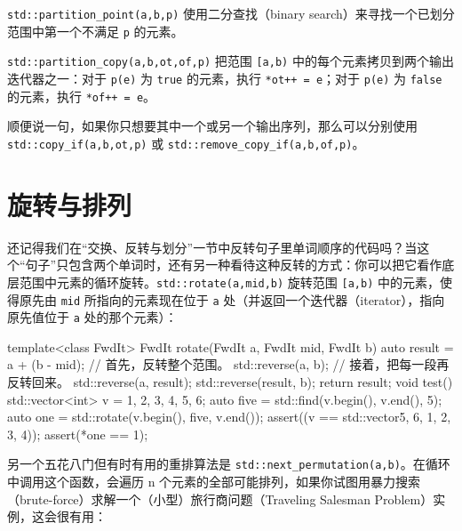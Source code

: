 \texttt{std::\allowbreak{}partition\_\allowbreak{}point(\allowbreak{}a,\allowbreak{}b,\allowbreak{}p)\allowbreak{}} 使用二分查找（binary search）来寻找一个已划分范围中第一个不满足 \texttt{p} 的元素。

\texttt{std::\allowbreak{}partition\_\allowbreak{}copy(\allowbreak{}a,\allowbreak{}b,\allowbreak{}ot,\allowbreak{}of,\allowbreak{}p)\allowbreak{}} 把范围 \texttt{[a,\allowbreak{}b)\allowbreak{}} 中的每个元素拷贝到两个输出迭代器之一：对于 \texttt{p(\allowbreak{}e)\allowbreak{}} 为 \texttt{true} 的元素，执行 \texttt{*ot++ = e}；对于 \texttt{p(\allowbreak{}e)\allowbreak{}} 为 \texttt{false} 的元素，执行 \texttt{*of++ = e}。

顺便说一句，如果你只想要其中一个或另一个输出序列，那么可以分别使用 \texttt{std::\allowbreak{}copy\_\allowbreak{}if(\allowbreak{}a,\allowbreak{}b,\allowbreak{}ot,\allowbreak{}p)\allowbreak{}} 或 \texttt{std::\allowbreak{}remove\_\allowbreak{}copy\_\allowbreak{}if(\allowbreak{}a,\allowbreak{}b,\allowbreak{}of,\allowbreak{}p)\allowbreak{}}。

\section{旋转与排列}

还记得我们在“交换、反转与划分”一节中反转句子里单词顺序的代码吗？当这个“句子”只包含两个单词时，还有另一种看待这种反转的方式：你可以把它看作底层范围中元素的循环旋转。\texttt{std::\allowbreak{}rotate(\allowbreak{}a,\allowbreak{}mid,\allowbreak{}b)\allowbreak{}} 旋转范围 \texttt{[a,\allowbreak{}b)\allowbreak{}} 中的元素，使得原先由 \texttt{mid} 所指向的元素现在位于 \texttt{a} 处（并返回一个迭代器（iterator），指向原先值位于 \texttt{a} 处的那个元素）：

\begin{codebox}[cpp]
     template<class FwdIt>
     FwdIt rotate(FwdIt a, FwdIt mid, FwdIt b)
     {
       auto result = a + (b - mid);
       // 首先，反转整个范围。
       std::reverse(a, b);
       // 接着，把每一段再反转回来。
       std::reverse(a, result);
       std::reverse(result, b);
       return result;
     }
     void test()
     {
       std::vector<int> v = {1, 2, 3, 4, 5, 6};
       auto five = std::find(v.begin(), v.end(), 5);
       auto one = std::rotate(v.begin(), five, v.end());
       assert((v == std::vector{5, 6, 1, 2, 3, 4}));
       assert(*one == 1);
     }
\end{codebox}

另一个五花八门但有时有用的重排算法是 \texttt{std::\allowbreak{}next\_\allowbreak{}permutation(\allowbreak{}a,\allowbreak{}b)\allowbreak{}}。在循环中调用这个函数，会遍历 n 个元素的全部可能排列，如果你试图用暴力搜索（brute-force）求解一个（小型）旅行商问题（Traveling Salesman Problem）实例，这会很有用：

